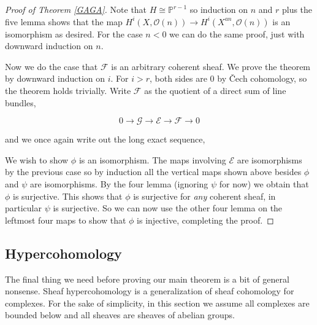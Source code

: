 \documentclass[a4paper]{article}
\newcommand{\F}{\mathcal{F}}
\newcommand{\OO}{\mathcal{O}}
\newcommand{\PP}{\mathbb{P}}
\numberwithin{theorem}{section}
\numberwithin{equation}{section}
\begin{document}
\begin{proof}[Proof of Theorem \ref{GAGA}]
\vspace{0.5 cm}

Note that $H \cong \PP^{r-1}$ so induction on $n$ and $r$ plus the five lemma shows that the map $H^i(X,\OO(n)) \rightarrow H^{i}(X^{an},\mathcal{O}(n))$ is an isomorphism as desired. For the case $n < 0$ we can do the same proof, just with downward induction on $n$.

Now we do the case that $\F$ is an arbitrary coherent sheaf. We prove the theorem by downward induction on $i$. For $i > r$, both sides are 0 by Čech cohomology, so the theorem holds trivially. Write $\F$ as the quotient of a direct sum of line bundles,

$$ 0 \rightarrow \mathcal{G} \rightarrow \mathcal{E} \rightarrow \F \rightarrow 0 $$

and we once again write out the long exact sequence,


We wish to show $\phi$ is an isomorphism. The maps involving $\mathcal{E}$ are isomorphisms by the previous case so by induction all the vertical maps shown above besides $\phi$ and $\psi$ are isomorphisms. By the four lemma (ignoring $\psi$ for now) we obtain that $\phi$ is surjective. This shows that $\phi$ is surjective for \textit{any} coherent sheaf, in particular $\psi$ is surjective. So we can now use the other four lemma on the leftmost four maps to show that $\phi$ is injective, completing the proof.

\end{proof}

\subsection{Hypercohomology}

The final thing we need before proving our main theorem is a bit of general nonsense. Sheaf hypercohomology is a generalization of sheaf cohomology for complexes. For the sake of simplicity, in this section we assume all complexes are bounded below and all sheaves are sheaves of abelian groups.
\end{document}
